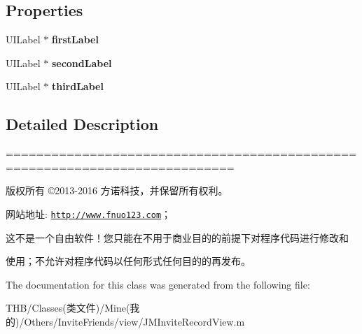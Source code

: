 \subsection*{Properties}
\begin{DoxyCompactItemize}
\item 
\mbox{\label{interface_j_m_invite_record_single_view_adee8ab376eeed2e644001395708e2560}} 
U\+I\+Label $\ast$ {\bfseries first\+Label}
\item 
\mbox{\label{interface_j_m_invite_record_single_view_a8fb17296336d0dfd2bcdcd64ae252a17}} 
U\+I\+Label $\ast$ {\bfseries second\+Label}
\item 
\mbox{\label{interface_j_m_invite_record_single_view_aaee68ba54a4a42de962c24ab7db3f0f1}} 
U\+I\+Label $\ast$ {\bfseries third\+Label}
\end{DoxyCompactItemize}


\subsection{Detailed Description}
============================================================================

版权所有 ©2013-\/2016 方诺科技，并保留所有权利。

网站地址\+: \href{http://www.fnuo123.com}{\tt http\+://www.\+fnuo123.\+com}； 



这不是一个自由软件！您只能在不用于商业目的的前提下对程序代码进行修改和

使用；不允许对程序代码以任何形式任何目的的再发布。 

 

The documentation for this class was generated from the following file\+:\begin{DoxyCompactItemize}
\item 
T\+H\+B/\+Classes(类文件)/\+Mine(我的)/\+Others/\+Invite\+Friends/view/J\+M\+Invite\+Record\+View.\+m\end{DoxyCompactItemize}

